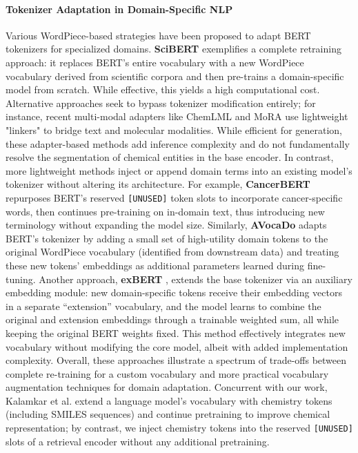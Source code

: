 \documentclass[twoside,twocolumn,9pt]{article}
\begin{document}
\paragraph*{Tokenizer Adaptation in Domain-Specific NLP} Various WordPiece-based \cite{wu2016google} strategies have been proposed to adapt BERT tokenizers for specialized domains. \textbf{SciBERT} \cite{beltagy2019scibert} exemplifies a complete retraining approach: it replaces BERT’s entire vocabulary with a new WordPiece vocabulary derived from scientific corpora and then pre-trains a domain-specific model from scratch. While effective, this yields a high computational cost. Alternative approaches seek to bypass tokenizer modification entirely; for instance, recent multi-modal adapters like ChemLML \cite{deng2025chemical} and MoRA \cite{yin2025mora} use lightweight "linkers" to bridge text and molecular modalities. While efficient for generation, these adapter-based methods add inference complexity and do not fundamentally resolve the segmentation of chemical entities in the base encoder. In contrast, more lightweight methods inject or append domain terms into an existing model’s tokenizer without altering its architecture. For example, \textbf{CancerBERT} \cite{zhou2022cancerbert} repurposes BERT’s reserved \texttt{[UNUSED]} token slots to incorporate cancer-specific words, then continues pre-training on in-domain text, thus introducing new terminology without expanding the model size. Similarly, \textbf{AVocaDo} \cite{hong2021avocado} adapts BERT’s tokenizer by adding a small set of high-utility domain tokens to the original WordPiece vocabulary (identified from downstream data) and treating these new tokens’ embeddings as additional parameters learned during fine-tuning. Another approach, \textbf{exBERT} \cite{tai2020exbert}, extends the base tokenizer via an auxiliary embedding module: new domain-specific tokens receive their embedding vectors in a separate “extension” vocabulary, and the model learns to combine the original and extension embeddings through a trainable weighted sum, all while keeping the original BERT weights fixed. This method effectively integrates new vocabulary without modifying the core model, albeit with added implementation complexity. Overall, these approaches illustrate a spectrum of trade-offs between complete re-training for a custom vocabulary and more practical vocabulary augmentation techniques for domain adaptation. Concurrent with our work, Kalamkar et al. \cite{kalamkar2025tokenization} extend a language model's vocabulary with chemistry tokens (including SMILES sequences) and continue pretraining to improve chemical representation; by contrast, we inject chemistry tokens into the reserved \texttt{[UNUSED]} slots of a retrieval encoder without any additional pretraining.
\end{document}
